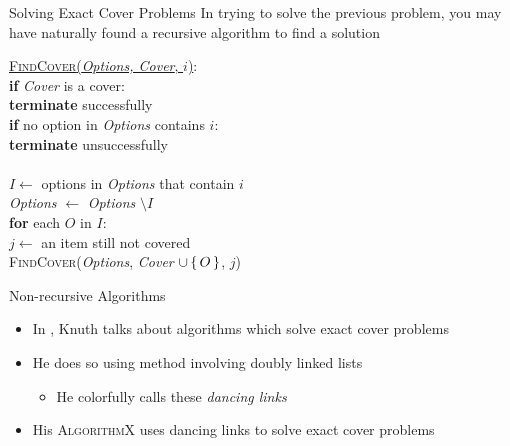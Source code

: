 \documentclass[aspectratio=169]{beamer}
\begin{document}
\begin{frame}{Solving Exact Cover Problems}
    In trying to solve the previous problem, you may have naturally found a recursive algorithm to find a solution \pause
    \begin{nalgo}
    \underline{\textsc{FindCover}(\emph{Options, Cover}, $i$)}:
    \\\label{}  \textbf{if} \emph{Cover} is a cover:\+
    \\\label{}      \textbf{terminate} successfully\-
    \\\label{}  \textbf{if} no option in \emph{Options} contains $i$:\+
    \\\label{}      \textbf{terminate} unsuccessfully\-
    \\\label{}
    \\\label{}  $I \gets$ options in \emph{Options} that contain $i$
    \\\label{}  \emph{Options} $\gets$ \emph{Options} $\setminus I$
    \\\label{}  \textbf{for} each $O$ in $I$:\+
    \\\label{}      $j \gets$ an item still not covered
    \\\label{}      \textsc{FindCover}(\emph{Options}, \emph{Cover} $\cup \set{O}$, $j$)
    \end{nalgo}
\end{frame}

\begin{frame}{Non-recursive Algorithms}
    \begin{itemize}
        \item In \cite[Chapter~7.2.1.1]{TAOCP4B}, Knuth talks about algorithms which solve exact cover problems \pause
        \item He does so using method involving \textcolor{sigma@mainblue}{doubly linked lists}
        \begin{itemize}
            \item He colorfully calls these \emph{dancing links}
        \end{itemize} \pause
        \item His \textsc{AlgorithmX} uses dancing links to solve exact cover problems
    \end{itemize}
\end{frame}
\end{document}
